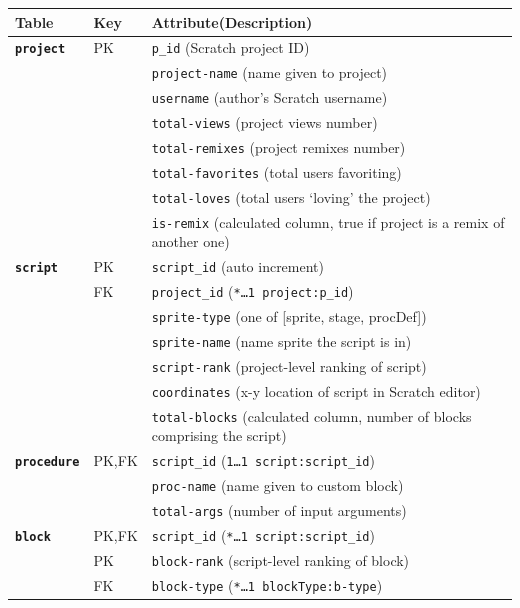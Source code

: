 \documentclass[10pt, conference]{IEEEtran}
\begin{document}
\begin{table}[]
	\centering
	\begin{tabular}{llp{5.4cm}}
		\textbf{Table}& \textbf{Key} & \textbf{Attribute(Description)}\\
		\hline
		\textbf{\texttt{project}} & PK & \texttt{p\_id} (Scratch project ID)\\
		&  & 							\texttt{project-name} (name given to project)\\
		&  & 							\texttt{username} (author's Scratch 
		username)\\
		&  & 							\texttt{total-views} (project views number)\\
		&  & 							\texttt{total-remixes} (project remixes number)\\
		&  & 							\texttt{total-favorites} (total users favoriting)\\
		&  & 							\texttt{total-loves} (total users `loving' the project)\\
		& & 							\texttt{is-remix} (calculated column, true if project is a remix of another one)\\
		\hline
		\textbf{\texttt{script}} & PK & \texttt{script\_id} (auto increment)\\
		& FK & 							\texttt{project\_id} (\texttt{\scriptsize{*\ldots1 project:p\_id}})\\
		& & 							\texttt{sprite-type} (one of [sprite, stage, procDef])\\
		& & 							\texttt{sprite-name} (name sprite the script is in)\\
		& & 							\texttt{script-rank} (project-level ranking of script)\\
		& & 							\texttt{coordinates} (x-y location of script in Scratch editor)\\
		& & 							\texttt{total-blocks} (calculated column, number of blocks comprising the script)\\
		\hline
		\textbf{\texttt{procedure}} & PK,FK & \texttt{script\_id} (\texttt{\scriptsize{1\ldots1 script:script\_id}})\\
		& & 							\texttt{proc-name} (name given to custom block)\\
		& & 							\texttt{total-args} (number of input arguments)\\
		\hline
		\textbf{\texttt{block}} & PK,FK  & \texttt{script\_id} (\texttt{\scriptsize{*\ldots1 script:script\_id}})\\
		& PK & \texttt{block-rank} (script-level ranking of block)\\
		& FK & \texttt{block-type} (\texttt{\scriptsize{*\ldots1 blockType:b-type}})\\

\end{tabular}
\end{table}
\end{document}
